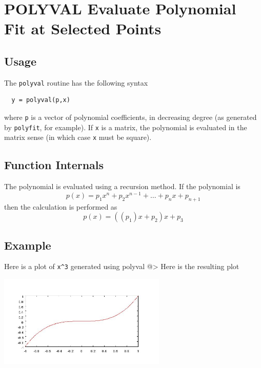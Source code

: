 \section{POLYVAL Evaluate Polynomial Fit at Selected Points}

\subsection{Usage}

The \verb|polyval| routine has the following syntax
\begin{verbatim}
  y = polyval(p,x)
\end{verbatim}
where \verb|p| is a vector of polynomial coefficients,
in decreasing degree (as generated by \verb|polyfit|, for example).
If \verb|x| is a matrix, the polynomial is evaluated in the matrix
sense (in which case \verb|x| must be square).
\subsection{Function Internals}

The polynomial is evaluated using a recursion method.  If the
polynomial is
\[
   p(x) = p_1 x^n + p_2 x^{n-1} + \dots + p_n x + p_{n+1}
\]
then the calculation is performed as
\[
   p(x) = ((p_1) x + p_2) x + p_3
\]
\subsection{Example}

Here is a plot of \verb|x^3| generated using polyval
@>
Here is the resulting plot


\centerline{\includegraphics[width=8cm]{polyval1}}

